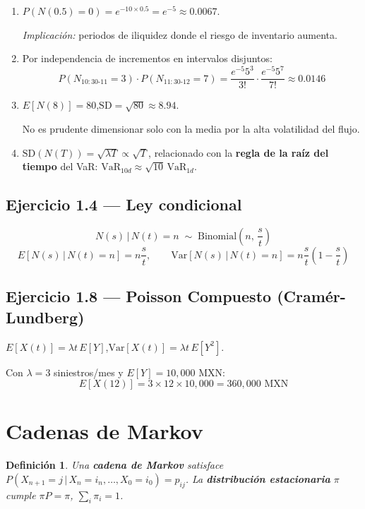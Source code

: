 \documentclass[12pt,letterpaper]{article}
\newtheorem{definition}{Definici\'on}[section]
\begin{document}
\begin{enumerate}[label=(\alph*)]
  \item $P(N(0.5)=0) = e^{-10 \times 0.5} = e^{-5} \approx 0.0067$.

    \textit{Implicaci\'on:} periodos de iliquidez donde el riesgo de inventario
    aumenta.

  \item Por independencia de incrementos en intervalos disjuntos:
    \[
      P(N_{10:30\text{-}11}=3)\cdot P(N_{11:30\text{-}12}=7)
      = \frac{e^{-5}5^3}{3!}\cdot\frac{e^{-5}5^7}{7!} \approx 0.0146
    \]

  \item $E[N(8)] = 80$,\quad $\mathrm{SD} = \sqrt{80} \approx 8.94$.

    No es prudente dimensionar solo con la media por la alta volatilidad del
    flujo.

  \item $\mathrm{SD}(N(T)) = \sqrt{\lambda T} \propto \sqrt{T}$, relacionado
    con la \textbf{regla de la ra\'iz del tiempo} del VaR:
    $\mathrm{VaR}_{10d} \approx \sqrt{10}\,\mathrm{VaR}_{1d}$.
\end{enumerate}

\subsection*{Ejercicio 1.4 --- Ley condicional}

\[
  N(s)\,|\,N(t)=n \;\sim\; \mathrm{Binomial}\!\left(n,\,\frac{s}{t}\right)
\]
\[
  E[N(s)\,|\,N(t)=n] = n\frac{s}{t}, \qquad
  \mathrm{Var}[N(s)\,|\,N(t)=n] = n\frac{s}{t}\left(1-\frac{s}{t}\right)
\]

\subsection*{Ejercicio 1.8 --- Poisson Compuesto (Cram\'er-Lundberg)}

$E[X(t)] = \lambda t\,E[Y]$,\quad $\mathrm{Var}[X(t)] = \lambda t\,E[Y^2]$.

Con $\lambda=3$ siniestros/mes y $E[Y]=10{,}000$ MXN:
\[
  E[X(12)] = 3 \times 12 \times 10{,}000 = 360{,}000 \text{ MXN}
\]

\section{Cadenas de Markov}

\begin{definition}
  Una \textbf{cadena de Markov} satisface
  $P(X_{n+1}=j\,|\,X_n=i_n,\ldots,X_0=i_0) = p_{ij}$.
  La \textbf{distribuci\'on estacionaria} $\pi$ cumple $\pi P = \pi$,
  $\sum_i \pi_i = 1$.
\end{definition}
\end{document}
